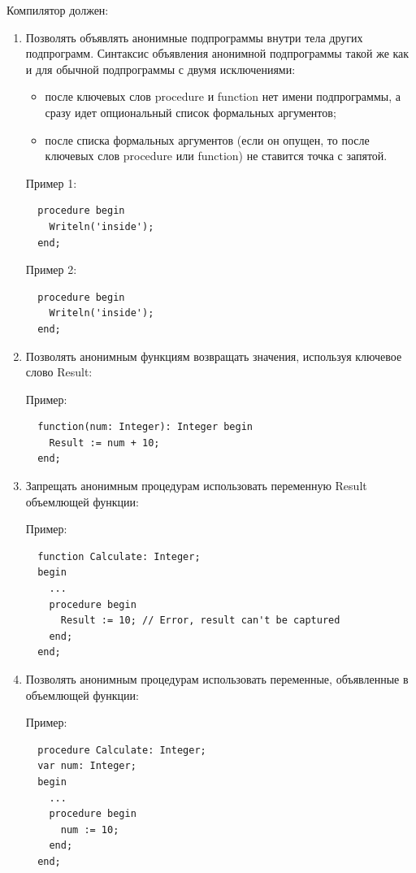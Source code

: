 \documentclass{imcs}
\begin{document}
Компилятор должен:
\begin{enumerate}
    \item Позволять объявлять анонимные подпрограммы внутри тела других подпрограмм.
Синтаксис объявления анонимной подпрограммы такой же как и для обычной подпрограммы с двумя исключениями:
        \begin{itemize}
            \item после ключевых слов procedure и function нет имени подпрограммы, а сразу идет опциональный список формальных аргументов;
            \item после списка формальных аргументов (если он опущен, то после ключевых слов procedure или function) не ставится точка с запятой.
        \end{itemize}

         Пример 1:
\begin{lstlisting}
  procedure begin
    Writeln('inside');
  end;
\end{lstlisting}

         Пример 2:
\begin{lstlisting}
  procedure begin
    Writeln('inside');
  end;
\end{lstlisting}

    \item Позволять анонимным функциям возвращать значения, используя ключевое слово Result:

Пример:
\begin{lstlisting}
  function(num: Integer): Integer begin
    Result := num + 10;
  end;
\end{lstlisting}

    \item Запрещать анонимным процедурам использовать переменную Result объемлющей функции:

Пример:
\begin{lstlisting}
  function Calculate: Integer;
  begin
    ...
    procedure begin
      Result := 10; // Error, result can't be captured
    end;
  end;
\end{lstlisting}

    \item Позволять анонимным процедурам использовать переменные, объявленные в объемлющей функции:

Пример:
\begin{lstlisting}
  procedure Calculate: Integer;
  var num: Integer;
  begin
    ...
    procedure begin
      num := 10;
    end;
  end;
\end{lstlisting}


\end{enumerate}
\end{document}
